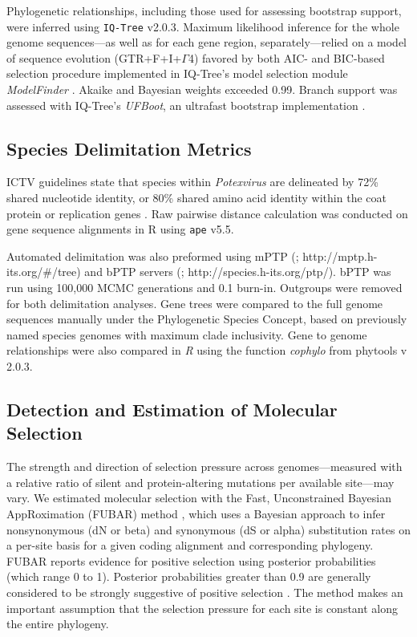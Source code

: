 \documentclass[fleqn,10pt,lineno]{wlpeerj}
\begin{document}
Phylogenetic relationships, including those used for assessing bootstrap support, were inferred using \texttt{IQ-Tree} v2.0.3. 
Maximum likelihood inference for the whole genome sequences---as well as for each gene region, separately---relied on a model of sequence evolution (GTR+F+I+$\Gamma$4) favored by both AIC- and BIC-based selection procedure implemented in IQ-Tree's model selection module {\em ModelFinder} \citep{kalyaanamoorthy2017}. 
Akaike and Bayesian weights exceeded 0.99. 
Branch support was assessed with IQ-Tree's {\em UFBoot}, an ultrafast bootstrap implementation \citep{hoang2018}.


\subsection*{Species Delimitation Metrics}
ICTV guidelines state that species within \textit{Potexvirus} are delineated by 72\% shared nucleotide identity, or 80\% shared amino acid identity within the coat protein or replication genes \citep{adams2004virology}.
Raw pairwise distance calculation was conducted on gene sequence alignments in R using \texttt{ape} v5.5.

Automated delimitation was also preformed using mPTP (\citealt{Kapli_2017}; http://mptp.h-its.org/\#/tree) and bPTP servers (\citealt{Zhang_2013}; http://species.h-its.org/ptp/). 
bPTP was run using 100,000 MCMC generations and 0.1 burn-in. 
Outgroups were removed for both delimitation analyses.
Gene trees were compared to the full genome sequences manually under the Phylogenetic Species Concept, based on previously named species genomes with maximum clade inclusivity.
Gene to genome relationships were also compared in \textit{R} using the function \textit{cophylo} from phytools v 2.0.3.


\subsection*{Detection and Estimation of Molecular Selection}

The strength and direction of selection pressure across genomes---measured with a relative ratio of silent and protein-altering mutations per available site---may vary. 
We estimated molecular selection with the Fast, Unconstrained Bayesian AppRoximation (FUBAR) method \citep{murrell2013}, which uses a Bayesian approach to infer nonsynonymous (dN or beta) and synonymous (dS or alpha) substitution rates on a per-site basis for a given coding alignment and corresponding phylogeny. 
FUBAR reports evidence for positive selection using posterior probabilities (which range 0 to 1).
Posterior probabilities greater than 0.9 are generally considered to be strongly suggestive of positive selection \citep{murrell2013}.
The method makes an important assumption that the selection pressure for each site is constant along the entire phylogeny.
\end{document}

